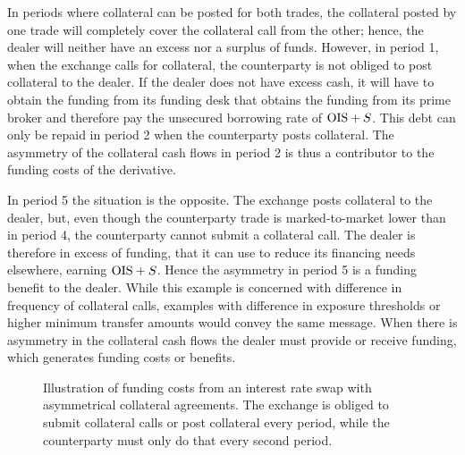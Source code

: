 \documentclass[main.tex]{subfiles}
\begin{document}
        In periods where collateral can be posted for both trades, 
        the collateral posted by one trade will completely cover the collateral call from the other;
        hence, the dealer will neither have an excess nor a surplus of funds.
        However, in period 1, when the exchange calls for collateral,
        the counterparty is not obliged to post collateral to the dealer. 
        If the dealer does not have excess cash, 
        it will have to obtain the funding from its funding desk
        that obtains the funding from its prime broker
        and therefore pay the unsecured borrowing rate of $\OIS/ + S$. 
        This debt can only be repaid in period 2 when the counterparty posts collateral.
        The asymmetry of the collateral cash flows in period 2
        is thus a contributor to the funding costs of the derivative.

        In period 5 the situation is the opposite.
        The exchange posts collateral to the dealer, 
        but, even though the counterparty trade is marked-to-market lower than in period 4,
        the counterparty cannot submit a collateral call. 
        The dealer is therefore in excess of funding,
        that it can use to reduce its financing needs elsewhere, earning $\OIS/ + S$.
        Hence the asymmetry in period 5 is a funding benefit to the dealer.
        While this example is concerned with difference in frequency of collateral calls,
        examples with difference in exposure thresholds or higher minimum transfer amounts 
        would convey the same message.
        When there is asymmetry in the collateral cash flows the dealer must provide or receive funding,
        which generates funding costs or benefits.

        \begin{figure}
            \centering
            \resizebox{\textwidth}{!}{%
            \begin{tikzpicture}
                
            \end{tikzpicture}        
            }   
            \caption{
                Illustration of funding costs from an interest rate swap with asymmetrical collateral agreements.
                The exchange is obliged to submit collateral calls or post collateral every period,
                while the counterparty must only do that every second period.
            }
            \label{fig:funding-costs-asymmetrical-csa}
        \end{figure}
\end{document}
